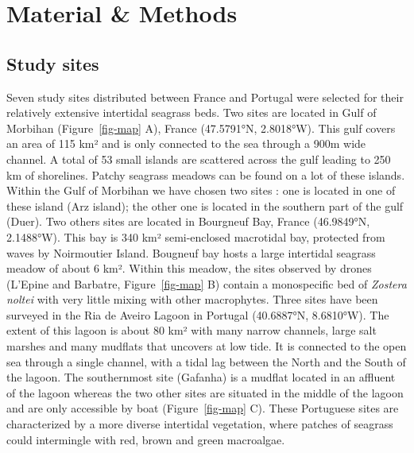 \documentclass[
  number]{elsarticle}
\begin{document}
\section{Material \& Methods}\label{material-methods}

\subsection{Study sites}\label{study-sites}

Seven study sites distributed between France and Portugal were selected
for their relatively extensive intertidal seagrass beds. Two sites are
located in Gulf of Morbihan (Figure~\ref{fig-map} A), France (47.5791°N,
2.8018°W). This gulf covers an area of 115 km² and is only connected to
the sea through a 900m wide channel. A total of 53 small islands are
scattered across the gulf leading to 250 km of shorelines. Patchy
seagrass meadows can be found on a lot of these islands. Within the Gulf
of Morbihan we have chosen two sites : one is located in one of these
island (Arz island); the other one is located in the southern part of
the gulf (Duer). Two others sites are located in Bourgneuf Bay, France
(46.9849°N, 2.1488°W). This bay is 340 km² semi-enclosed macrotidal bay,
protected from waves by Noirmoutier Island. Bougneuf bay hosts a large
intertidal seagrass meadow of about 6 km². Within this meadow, the sites
observed by drones (L'Epine and Barbatre, Figure~\ref{fig-map} B)
contain a monospecific bed of \emph{Zostera noltei} with very little
mixing with other macrophytes. Three sites have been surveyed in the Ria
de Aveiro Lagoon in Portugal (40.6887°N, 8.6810°W). The extent of this
lagoon is about 80 km² with many narrow channels, large salt marshes and
many mudflats that uncovers at low tide. It is connected to the open sea
through a single channel, with a tidal lag between the North and the
South of the lagoon. The southernmost site (Gafanha) is a mudflat
located in an affluent of the lagoon whereas the two other sites are
situated in the middle of the lagoon and are only accessible by boat
(Figure~\ref{fig-map} C). These Portuguese sites are characterized by a
more diverse intertidal vegetation, where patches of seagrass could
intermingle with red, brown and green macroalgae.
\end{document}
